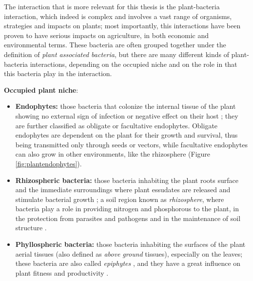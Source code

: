 The interaction that is more relevant for this thesis is the plant-bacteria interaction, which indeed is complex and involves a vast range of organisms, strategies and impacts on plants; most importantly, this interactions have been proven to have serious impacts on agriculture, in both economic and environmental terms. These bacteria are often grouped together under the definition of \textit{plant associated bacteria}, but there are many different kinds of plant-bacteria interactions, depending on the occupied niche and on the role in that this bacteria play in the interaction.

\textbf{Occupied plant niche}:
\begin{itemize}
\item \textbf{Endophytes:} those bacteria that colonize the internal tissue of the plant showing no external sign of infection or negative effect on their host \cite{holliday2001dictionary}\cite{schulz2006microbial}; they are further classified as obligate or facultative endophytes. Obligate endophytes are dependent on the plant for their growth and survival, thus being transmitted only through seeds or vectors, while facultative endophytes can also grow in other environments, like the rhizosphere \cite{ryan2007bacterial} (Figure \ref{fig:plantendophytes}).
\item \textbf{Rhizospheric bacteria:} those bacteria inhabiting the plant roots surface and the immediate surroundings where plant essudates are released and stimulate bacterial growth \cite{haas2005biological}; a soil region known as \textit{rhizosphere}, where bacteria play a role in providing nitrogen and phosphorous to the plant, in the protection from parasites and pathogens and in the maintenance of soil structure \cite{singh2004unravelling}.
\item \textbf{Phyllospheric bacteria:} those bacteria inhabiting the surfaces of the plant aerial tissues (also defined as \textit{above ground} tissues), especially on the leaves; these bacteria are also called \textit{epiphytes} \cite{lindow2003microbiology}, and they have a great influence on plant fitness and productivity \cite{whipps2008phyllosphere}.
\end{itemize}


